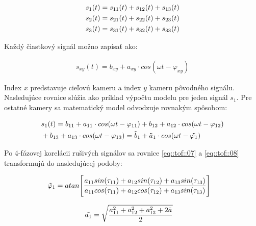 \begin{equation}
\label{eq::tof::10}
\begin{aligned}
s_1 (t) }= {s_{11}(t)+s_{12}(t)+s_{13}(t) \\
s_2 (t) }= {s_{21}(t)+s_{22}(t)+s_{23}(t) \\
s_3 (t) }= {s_{31}(t)+s_{32}(t)+s_{33}(t) 
\end{aligned}
\end{equation}

Každý čiastkový signál možno zapísať ako:

\begin{equation}
\label{eq::tof::11}
\begin{aligned}
 s_{xy}(t) = b_{xy}+a_{xy} \cdot cos(\omega t - \varphi _{xy})
\end{aligned}
\end{equation}

Index $x$ predstavuje cieľovú kameru a index $y$ kameru pôvodného signálu. Nasledujúce rovnice slúžia ako príklad výpočtu modelu pre jeden signál $s_1$. Pre ostatné kamery sa matematický model odvodzuje rovnakým spôsobom:

\begin{equation}
\label{eq::tof::12}
\begin{aligned}
&{s_{1}(t) }= {b_{11}+a_{11} \cdot cos(\omega t - \varphi _{11}) + {b_{12} +a_{12} \cdot cos(\omega t - \varphi _{12})}} \\ 
&+ {{b_{13}+a_{13} \cdot cos(\omega t - \varphi _{13})} = \Tilde{b}_1 + \Tilde{a}_1 \cdot cos(\omega t - \Tilde{\varphi_1})}  
\end{aligned}
\end{equation}

Po 4-fázovej korelácii rušivých signálov sa rovnice \ref{eq::tof::07} a \ref{eq::tof::08} transformujú do nasledujúcej podoby:

\begin{equation}
\label{eq::tof::13}
\begin{aligned}
&{ \Tilde{\varphi}_1}= atan \Bigg[ {\frac{a_{11}  sin( \tau _{11}) + a_{12}  sin( \tau _{12}) + a_{13}  sin( \tau _{13})}{a_{11}  cos( \tau _{11}) + a_{12}  cos( \tau _{12}) + a_{13}  sin( \tau _{13}) }} \Bigg]
\end{aligned}
\end{equation}

\begin{equation}
\label{eq::tof::14}
\begin{aligned}
&\Tilde{ a_1 }= {\sqrt{\frac{a_{11}^2+a_{12}^2+a_{13}^2 + 2\bar{a}}{2} }}
\end{aligned}
\end{equation}


